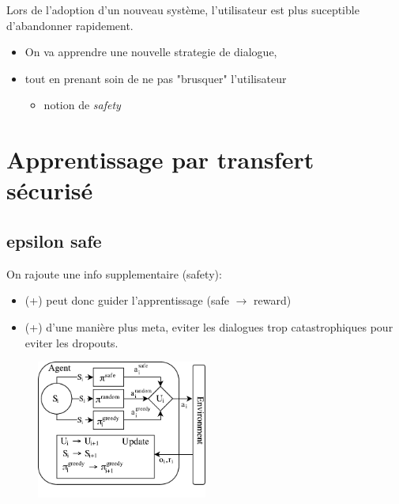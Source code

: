 \documentclass[french,handout]{beamer}
\begin{document}
    \begin{frame}
        Lors de l'adoption d'un nouveau système, l'utilisateur est plus suceptible d'abandonner rapidement.
        \begin{block}{}
            \begin{itemize}
                \item On va apprendre une nouvelle strategie de dialogue,
                \item tout en prenant soin de ne pas "brusquer" l'utilisateur
                \begin{itemize}\item notion de \textit{safety}\end{itemize}
            \end{itemize}
        \end{block}

    \end{frame}

    \section{Apprentissage par transfert sécurisé}

    \subsection{epsilon safe}

    \begin{frame}
        On rajoute une info supplementaire (safety): %
        \begin{itemize}
            \item (+) peut donc guider l'apprentissage (safe $\rightarrow$ reward)
            \item (+) d'une manière plus meta, eviter les dialogues trop catastrophiques pour eviter les dropouts.
        \end{itemize}

    \end{frame}

    \begin{frame}

        \begin{figure}
            \begin{center}
                \includegraphics[width=0.5\textwidth]{img/transfer7.pdf}
            \end{center}
        \end{figure}

    \end{frame}
\end{document}
